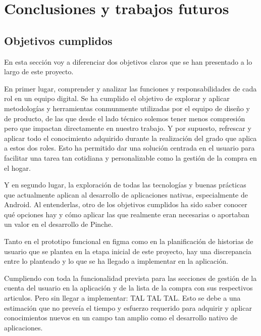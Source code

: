 \cleardoublepage
\chapter{Conclusiones y trabajos futuros}
\label{chap:conclusiones-trabajos-futuros}


\section{Objetivos cumplidos}
\label{sec:objetivos-cumplidos}
En esta sección voy a diferenciar dos objetivos claros que se han presentado a lo largo de este proyecto.

En primer lugar, comprender y analizar las funciones y responsabilidades de cada rol en un equipo digital. Se ha cumplido el objetivo de explorar y aplicar metodologías y herramientas conmunmente utilizadas por el equipo de diseño y de producto, de las que desde el lado técnico solemos tener menos compresión pero que impactan directamente en nuestro trabajo. Y por supuesto, refrescar y aplicar todo el conocimiento adquirido durante la realización del grado que aplica a estos dos roles. Esto ha permitido dar una solución centrada en el usuario para facilitar una tarea tan cotidiana y personalizable como la gestión de la compra en el hogar.

Y en segundo lugar, la exploración de todas las tecnologías y buenas prácticas que actualmente aplican al desarrollo de aplicaciones nativas, especialmente de Android. Al entenderlas, otro de los objetivos cumplidos ha sido saber conocer qué opciones hay y cómo aplicar las que realmente eran necesarias o aportaban un valor en el desarrollo de Pinche.

Tanto en el prototipo funcional en figma como en la planificación de historias de usuario que se plantea en la etapa inicial de este proyecto, hay una discrepancia entre lo planteado y lo que se ha llegado a implementar en la aplicación.

Cumpliendo con toda la funcionalidad prevista para las secciones de gestión de la cuenta del usuario en la aplicación y de la lista de la compra con sus respectivos articulos. Pero sin llegar a implementar: TAL TAL TAL. Esto se debe a una estimación que no preveía el tiempo y esfuerzo requerido para adquirir y aplicar conocimientos nuevos en un campo tan amplio como el desarrollo nativo de aplicaciones.

